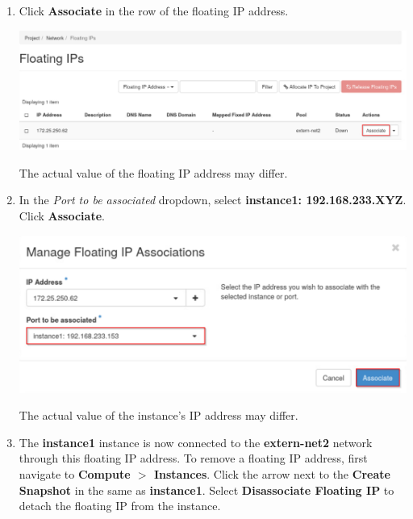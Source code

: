 \documentclass[letterpaper, 12pt]{article}
\begin{document}
\begin{enumerate}
    \item Click \textbf{Associate} in the row of the floating IP address.

    \begin{center}
        \includegraphics[width=\linewidth]{images/part3/step6.png}
    \end{center}

    \begin{notebox}
        The actual value of the floating IP address may differ.
    \end{notebox}

    \item In the \textit{Port to be associated} dropdown, select \textbf{instance1: 192.168.233.XYZ}.
    Click \textbf{Associate}.

    \begin{center}
        \includegraphics[width=\linewidth]{images/part3/step7.png}
    \end{center}

    \begin{notebox}
        The actual value of the instance's IP address may differ.
    \end{notebox}

    \item The \textbf{instance1} instance is now connected to the \textbf{extern-net2} network through this floating IP address.
    To remove a floating IP address, first navigate to \textbf{Compute $>$ Instances}.
    Click the arrow next to the \textbf{Create Snapshot} in the same as \textbf{instance1}.
    Select \textbf{Disassociate Floating IP} to detach the floating IP from the instance.


\end{enumerate}
\end{document}
